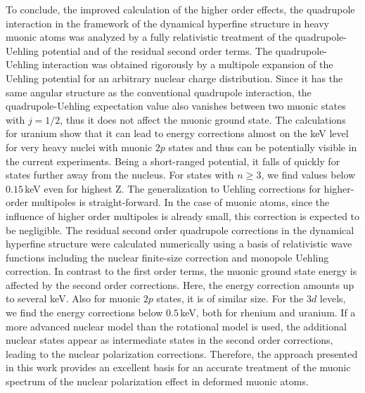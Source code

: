 To conclude, the improved calculation of the higher order effects, the quadrupole interaction in the framework of the dynamical hyperfine structure in heavy muonic atoms was analyzed by a fully relativistic treatment of the quadrupole-Uehling potential and of the residual second order terms.
The quadrupole-Uehling interaction was obtained rigorously by a multipole expansion of the Uehling potential for an arbitrary nuclear charge distribution.
Since it has the same angular structure as the conventional quadrupole interaction, the quadrupole-Uehling expectation value also vanishes between two muonic states with $j=1/2$, thus it does not affect the muonic ground state.
The calculations for uranium show that it can lead to energy corrections almost on the keV level for very heavy nuclei with muonic $2p$ states and thus can be potentially visible in the current experiments. Being a short-ranged potential, it falls of quickly for states further away from the nucleus. For states with $n\geq3$, we find values below $0.15\,$keV even for highest Z.
The generalization to Uehling corrections for higher-order multipoles is straight-forward. In the case of muonic atoms, since the influence of higher order multipoles is already small, this correction is expected to be negligible.
The residual second order quadrupole corrections in the dynamical hyperfine structure were calculated numerically using a basis of relativistic wave functions including the nuclear finite-size correction and monopole Uehling correction.
In contrast to the first order terms, the muonic ground state energy is affected by the second order corrections. Here, the energy correction amounts up to several keV. Also for muonic $2p$ states, it is of similar size. For the $3d$ levels, we find the energy corrections below $0.5\,$keV, both for rhenium and uranium.
If a more advanced nuclear model than the rotational model is used, the additional nuclear states appear as intermediate states in the second order corrections, leading to the nuclear polarization corrections. Therefore, the approach presented in this work provides an excellent basis for an accurate treatment of the muonic spectrum of the nuclear polarization effect in deformed muonic atoms.

